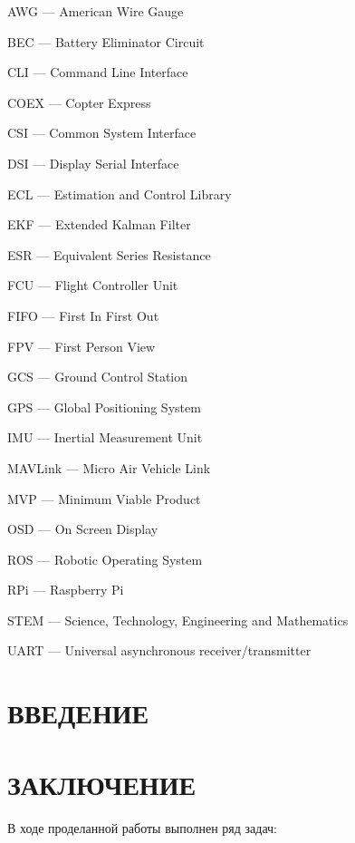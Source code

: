 \documentclass[a4paper,12pt]{article}
\begin{document}
AWG --- American Wire Gauge

BEC --- Battery Eliminator Circuit

CLI --- Command Line Interface

COEX --- Copter Express

CSI --- Common System Interface

DSI --- Display Serial Interface

ECL --- Estimation and Control Library

EKF --- Extended Kalman Filter

ESR --- Equivalent Series Resistance

FCU --- Flight Controller Unit

FIFO --- First In First Out

FPV --- First Person View

GCS --- Ground Control Station

GPS --- Global Positioning System

IMU --- Inertial Measurement Unit

MAVLink --- Micro Air Vehicle Link

MVP --- Minimum Viable Product

OSD --- On Screen Display

ROS --- Robotic Operating System

RPi --- Raspberry Pi

STEM --- Science, Technology, Engineering and Mathematics

UART --- Universal asynchronous receiver/transmitter


\pagebreak
{}
\tableofcontents

\thispagestyle{empty} %
\pagebreak

\setcounter{page}{3}
\section*{\centering ВВЕДЕНИЕ}
\pagebreak
\pagebreak
\pagebreak
\pagebreak
\pagebreak
\pagebreak

\section*{\centering ЗАКЛЮЧЕНИЕ}
В ходе проделанной работы выполнен ряд задач:
\end{document}
